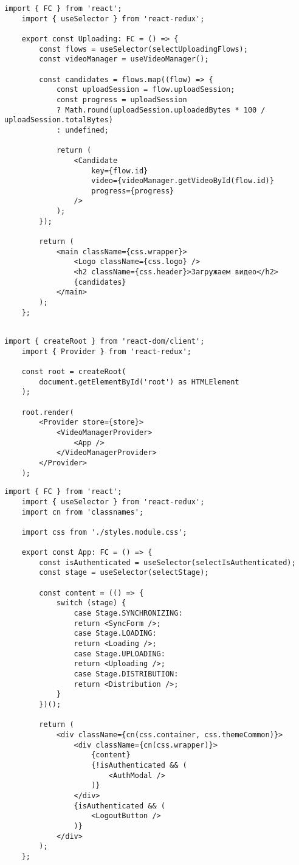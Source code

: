 \begin{lstlisting}[caption={Uploading.tsx}]
	import { FC } from 'react';
	import { useSelector } from 'react-redux';
	
	export const Uploading: FC = () => {    
		const flows = useSelector(selectUploadingFlows);
		const videoManager = useVideoManager();
		
		const candidates = flows.map((flow) => {
			const uploadSession = flow.uploadSession;
			const progress = uploadSession
			? Math.round(uploadSession.uploadedBytes * 100 / uploadSession.totalBytes)
			: undefined;
			
			return (
				<Candidate
					key={flow.id}
					video={videoManager.getVideoById(flow.id)}
					progress={progress}
				/>
			);
		});
		
		return (
			<main className={css.wrapper}>
				<Logo className={css.logo} />
				<h2 className={css.header}>Загружаем видео</h2>
				{candidates}
			</main>
		);
	};
	
\end{lstlisting}

\begin{lstlisting}[caption={Root.tsx}]
	import { createRoot } from 'react-dom/client';
	import { Provider } from 'react-redux';
	
	const root = createRoot(
		document.getElementById('root') as HTMLElement
	);
	
	root.render(
		<Provider store={store}>
			<VideoManagerProvider>
				<App />
			</VideoManagerProvider>
		</Provider>
	);
\end{lstlisting}

\begin{lstlisting}[caption={App.tsx}]
	import { FC } from 'react';
	import { useSelector } from 'react-redux';
	import cn from 'classnames';
	
	import css from './styles.module.css';
	
	export const App: FC = () => {    
		const isAuthenticated = useSelector(selectIsAuthenticated);
		const stage = useSelector(selectStage);
		
		const content = (() => {
			switch (stage) {
				case Stage.SYNCHRONIZING:
				return <SyncForm />;
				case Stage.LOADING:
				return <Loading />;
				case Stage.UPLOADING:
				return <Uploading />;
				case Stage.DISTRIBUTION:
				return <Distribution />;
			}
		})();
		
		return (
			<div className={cn(css.container, css.themeCommon)}>
				<div className={cn(css.wrapper)}>
					{content}
					{!isAuthenticated && (
						<AuthModal />
					)}
				</div>
				{isAuthenticated && (
					<LogoutButton />
				)}
			</div>
		);
	};
\end{lstlisting}

